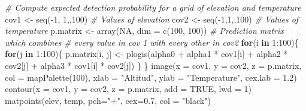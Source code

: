 \documentclass[
]{book}
\newenvironment{Shaded}{\begin{snugshade}}{\end{snugshade}}
\newcommand{\AttributeTok}[1]{\textcolor[rgb]{0.77,0.63,0.00}{#1}}
\newcommand{\CommentTok}[1]{\textcolor[rgb]{0.56,0.35,0.01}{\textit{#1}}}
\newcommand{\ConstantTok}[1]{\textcolor[rgb]{0.00,0.00,0.00}{#1}}
\newcommand{\ControlFlowTok}[1]{\textcolor[rgb]{0.13,0.29,0.53}{\textbf{#1}}}
\newcommand{\DecValTok}[1]{\textcolor[rgb]{0.00,0.00,0.81}{#1}}
\newcommand{\FloatTok}[1]{\textcolor[rgb]{0.00,0.00,0.81}{#1}}
\newcommand{\FunctionTok}[1]{\textcolor[rgb]{0.00,0.00,0.00}{#1}}
\newcommand{\NormalTok}[1]{#1}
\newcommand{\OtherTok}[1]{\textcolor[rgb]{0.56,0.35,0.01}{#1}}
\newcommand{\SpecialCharTok}[1]{\textcolor[rgb]{0.00,0.00,0.00}{#1}}
\newcommand{\StringTok}[1]{\textcolor[rgb]{0.31,0.60,0.02}{#1}}
\begin{document}
\begin{Shaded}
\begin{Highlighting}[]
\CommentTok{\# Compute expected detection probability for a grid of elevation and temperature}
\NormalTok{cov1 }\OtherTok{\textless{}{-}} \FunctionTok{seq}\NormalTok{(}\SpecialCharTok{{-}}\DecValTok{1}\NormalTok{, }\DecValTok{1}\NormalTok{,,}\DecValTok{100}\NormalTok{)                  }\CommentTok{\# Values of elevation}
\NormalTok{cov2 }\OtherTok{\textless{}{-}} \FunctionTok{seq}\NormalTok{(}\SpecialCharTok{{-}}\DecValTok{1}\NormalTok{,}\DecValTok{1}\NormalTok{,,}\DecValTok{100}\NormalTok{)                   }\CommentTok{\# Values of temperature}
\NormalTok{p.matrix }\OtherTok{\textless{}{-}} \FunctionTok{array}\NormalTok{(}\ConstantTok{NA}\NormalTok{, }\AttributeTok{dim =} \FunctionTok{c}\NormalTok{(}\DecValTok{100}\NormalTok{, }\DecValTok{100}\NormalTok{)) }\CommentTok{\# Prediction matrix which combines }
\CommentTok{\# every value in cov 1 with every other in cov2}
\ControlFlowTok{for}\NormalTok{(i }\ControlFlowTok{in} \DecValTok{1}\SpecialCharTok{:}\DecValTok{100}\NormalTok{)\{}
   \ControlFlowTok{for}\NormalTok{(j }\ControlFlowTok{in} \DecValTok{1}\SpecialCharTok{:}\DecValTok{100}\NormalTok{)\{}
\NormalTok{      p.matrix[i, j] }\OtherTok{\textless{}{-}} \FunctionTok{plogis}\NormalTok{(alpha0 }\SpecialCharTok{+}\NormalTok{ alpha1 }\SpecialCharTok{*}\NormalTok{ cov1[i] }\SpecialCharTok{+} 
\NormalTok{                                 alpha2 }\SpecialCharTok{*}\NormalTok{ cov2[j] }\SpecialCharTok{+} 
\NormalTok{                                 alpha3 }\SpecialCharTok{*}\NormalTok{ cov1[i] }\SpecialCharTok{*}\NormalTok{ cov2[j])}
\NormalTok{   \}}
\NormalTok{\}}
\FunctionTok{image}\NormalTok{(}\AttributeTok{x =}\NormalTok{ cov1, }\AttributeTok{y =}\NormalTok{ cov2, }\AttributeTok{z =}\NormalTok{ p.matrix, }\AttributeTok{col =} \FunctionTok{mapPalette}\NormalTok{(}\DecValTok{100}\NormalTok{), }\AttributeTok{xlab =} \StringTok{"Altitud"}\NormalTok{, }
      \AttributeTok{ylab =} \StringTok{"Temperature"}\NormalTok{, }\AttributeTok{cex.lab =} \FloatTok{1.2}\NormalTok{)}
\FunctionTok{contour}\NormalTok{(}\AttributeTok{x =}\NormalTok{ cov1, }\AttributeTok{y =}\NormalTok{ cov2, }\AttributeTok{z =}\NormalTok{ p.matrix, }\AttributeTok{add =} \ConstantTok{TRUE}\NormalTok{, }\AttributeTok{lwd =} \DecValTok{1}\NormalTok{)}
\FunctionTok{matpoints}\NormalTok{(elev, temp, }\AttributeTok{pch=}\StringTok{"+"}\NormalTok{, }\AttributeTok{cex=}\FloatTok{0.7}\NormalTok{, }\AttributeTok{col =} \StringTok{"black"}\NormalTok{)}
\end{Highlighting}
\end{Shaded}
\end{document}
